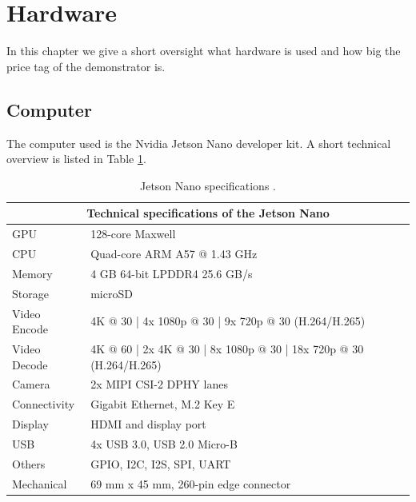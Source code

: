 \section{Hardware}
In this chapter we give a short oversight what hardware is used and how big the price tag of the demonstrator is. 

\subsection{Computer}
The computer used is the Nvidia Jetson Nano developer kit.
A short technical overview is listed in Table \ref{development:nano}.
\begin{table}[ht]
	\begin{tabular}{|l|l|}
		\hline
		\multicolumn{2}{|c|}{Technical specifications of the Jetson Nano} \\
		\hline
		GPU			& 	128-core Maxwell\\
		CPU			& 	Quad-core ARM A57 @ 1.43 GHz \\
		Memory 		&	4 GB 64-bit LPDDR4 25.6 GB/s 				\\
		Storage		&	microSD				\\
		Video Encode&	4K @ 30 | 4x 1080p @ 30 | 9x 720p @ 30 (H.264/H.265) \\
		Video Decode&	4K @ 60 | 2x 4K @ 30 | 8x 1080p @ 30 | 18x 720p @ 30 (H.264/H.265) \\
		Camera 		&	2x MIPI CSI-2 DPHY lanes \\
		Connectivity&	Gigabit Ethernet, M.2 Key E\\
		Display 	&	HDMI and display port \\
		USB 		&	4x USB 3.0, USB 2.0 Micro-B\\
		Others 		&	GPIO, I2C, I2S, SPI, UART \\
		Mechanical 	&	69 mm x 45 mm, 260-pin edge connector \\		
		\hline
	\end{tabular}
	\caption{Jetson Nano specifications \cite{jetson}.\label{development:nano}}
\end{table}




